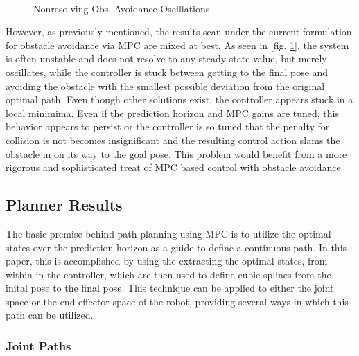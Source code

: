 \documentclass[journal]{IEEEtran}
\begin{document}
\begin{figure}[ht]%
    \centering
    \\
    \caption{Nonresolving Obs. Avoidance Oscillations}%
    \label{fig:obs_avoid_path_bad}%
\end{figure}

However, as previously mentioned, the results sean under the current formulation for obstacle avoidance via MPC are mixed at best. As seen in [fig. \ref{fig:obs_avoid_path_bad}], the system is often unstable and does not resolve to any steady state value, but merely oscillates, while the controller is stuck between getting to the final pose and avoiding the obstacle with the smallest possible deviation from the original optimal path. Even though other solutions exist, the controller appears stuck in a local minimima. Even if the prediction horizon and MPC gains are tuned, this behavior appears to persist or the controller is so tuned that the penalty for collision is not becomes insignificant and the resulting control action slams the obstacle in on its way to the goal pose. This problem would benefit from a more rigorous and sophisticated treat of MPC based control with obstacle avoidance


\subsection{Planner Results}

The basic premise behind path planning using MPC is to utilize the optimal states over the prediction horizon as a guide to define a continuous path. In this paper, this is accomplished by using the extracting the optimal states, from within in the controller, which are then used to define cubic splines from the inital pose to the final pose. This technique can be applied to either the joint space or the end effector space of the robot, providing several ways in which this path can be utilized. \\

\subsubsection{Joint Paths}
\end{document}
